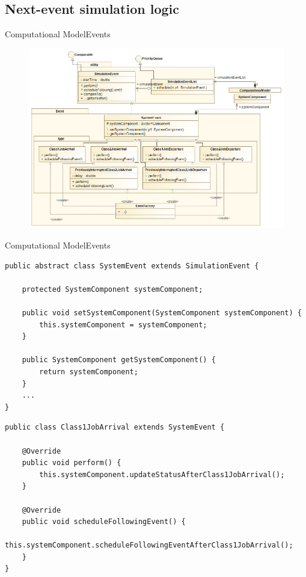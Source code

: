 \documentclass[10pt]{beamer}
\begin{document}
\subsection{Next-event simulation logic}
\begin{frame}{Computational Model}{Events}
\begin{figure}
\centering
\includegraphics[width=\textwidth]{./images/ClassDiagramEvent.png}
\label{fig:Concorrente}
\end{figure}
\end{frame}


\begin{frame}[fragile]{Computational Model}{Events}

\begin{lstlisting}[frame=lines, caption={\texttt{SystemEvent} class}]
public abstract class SystemEvent extends SimulationEvent {

    protected SystemComponent systemComponent;

    public void setSystemComponent(SystemComponent systemComponent) {
        this.systemComponent = systemComponent;
    }

    public SystemComponent getSystemComponent() {
        return systemComponent;
    }
    ...
}
\end{lstlisting}

\begin{lstlisting}[frame=lines, caption={\texttt{Class1JobArrival} class}]
public class Class1JobArrival extends SystemEvent {

    @Override
    public void perform() {
        this.systemComponent.updateStatusAfterClass1JobArrival();
    }

    @Override
    public void scheduleFollowingEvent() {
        this.systemComponent.scheduleFollowingEventAfterClass1JobArrival();
    }
}
\end{lstlisting}
\end{frame}
\end{document}
